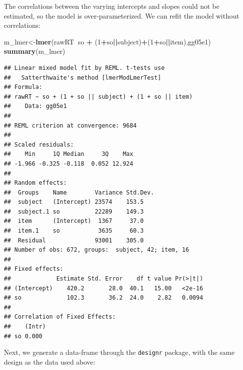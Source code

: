 \documentclass[12pt,]{krantz}
\newenvironment{Shaded}{\begin{snugshade}}{\end{snugshade}}
\newcommand{\DecValTok}[1]{\textcolor[rgb]{0.00,0.00,0.81}{#1}}
\newcommand{\KeywordTok}[1]{\textcolor[rgb]{0.13,0.29,0.53}{\textbf{#1}}}
\newcommand{\NormalTok}[1]{#1}
\newcommand{\OperatorTok}[1]{\textcolor[rgb]{0.81,0.36,0.00}{\textbf{#1}}}
\newcommand{\StringTok}[1]{\textcolor[rgb]{0.31,0.60,0.02}{#1}}
\begin{document}
The correlations between the varying intercepts and slopes could not be estimated, so the model is over-parameterized. We can refit the model without correlations:

\begin{Shaded}
\begin{Highlighting}[]
\NormalTok{m_lmer<-}\KeywordTok{lmer}\NormalTok{(rawRT}\OperatorTok{~}\NormalTok{so }\OperatorTok{+}\StringTok{ }\NormalTok{(}\DecValTok{1}\OperatorTok{+}\NormalTok{so}\OperatorTok{||}\NormalTok{subject)}\OperatorTok{+}\NormalTok{(}\DecValTok{1}\OperatorTok{+}\NormalTok{so}\OperatorTok{||}\NormalTok{item),gg05e1)}
\KeywordTok{summary}\NormalTok{(m_lmer)}
\end{Highlighting}
\end{Shaded}

\begin{verbatim}
## Linear mixed model fit by REML. t-tests use
##   Satterthwaite's method [lmerModLmerTest]
## Formula: 
## rawRT ~ so + (1 + so || subject) + (1 + so || item)
##    Data: gg05e1
## 
## REML criterion at convergence: 9684
## 
## Scaled residuals: 
##    Min     1Q Median     3Q    Max 
## -1.966 -0.325 -0.118  0.052 12.924 
## 
## Random effects:
##  Groups    Name        Variance Std.Dev.
##  subject   (Intercept) 23574    153.5   
##  subject.1 so          22289    149.3   
##  item      (Intercept)  1367     37.0   
##  item.1    so           3635     60.3   
##  Residual              93001    305.0   
## Number of obs: 672, groups:  subject, 42; item, 16
## 
## Fixed effects:
##             Estimate Std. Error    df t value Pr(>|t|)
## (Intercept)    420.2       28.0  40.1   15.00   <2e-16
## so             102.3       36.2  24.0    2.82   0.0094
## 
## Correlation of Fixed Effects:
##    (Intr)
## so 0.000
\end{verbatim}

Next, we generate a data-frame through the \texttt{designr} package, with the same design as the data used above:
\end{document}
